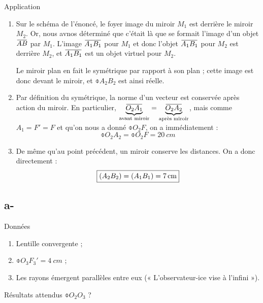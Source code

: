 \documentclass[10pt,a5paper,notitlepage]{book}
\begin{document}
\begin{NCexem}{Application}
    \begin{enumerate}
        \item Sur le schéma de l'énoncé, le foyer image du miroir $M_1$ est
            derrière le miroir $M_2$. Or, nous avnos déterminé que c'était là
            que se formait l'image d'un objet $\ABb$ par $M_1$. L'image $\ABa$
            pour $M_1$ et donc l'objet $\ABa$ pour $M_2$ est derrière $M_2$, et
            $\ABa$ est un objet virtuel pour $M_2$.

            Le miroir plan en fait le symétrique par rapport à son plan ;
            cette image est donc devant le miroir, et $\obar{A_2B_2}$ est ainsi
            réelle.

        \item Par définition du symétrique, la norme d'un vecteur est conservée
            après action du miroir. En particulier,
            $\underbrace{\obar{O_2A_1}}\St{avant miroir} =
            \underbrace{\obar{O_2A_2}}\St{après miroir}$, mais comme $A_1 = F' =
            F$ et qu'on nous a donné $\obar{O_2F}$, on a immédiatement :
            \[ \boxed{\obar{O_2A_2}= \obar{O_2F} = \SI{20}{cm}} \]

        \item De même qu'au point précédent, un miroir conserve les distances.
            On a donc directement :
            \[ \boxed{ \left(A_2B_2\right) = \left(A_1B_1\right) = \SI{7}{cm}} \]
    \end{enumerate}
\end{NCexem}

\subsection{a-}
\begin{NCdefi}{Données}
    \begin{enumerate}
        \item Lentille convergente ;
        \item $\obar{O_3F_3'} = \SI{4}{cm}$ ;
        \item Les rayons émergent parallèles entre eux (« L'observateur-ice vise
            à l'infini »).
    \end{enumerate}
\end{NCdefi}

\begin{NCprop}{Résultats attendus}
    $\obar{O_2O_3}$ ?
\end{NCprop}
\end{document}
